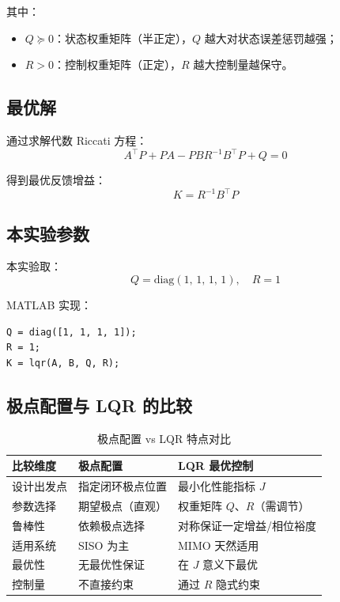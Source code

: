 \documentclass[12pt, a4paper]{article}
\begin{document}
其中：
\begin{itemize}
    \item $Q \succeq 0$：状态权重矩阵（半正定），$Q$ 越大对状态误差惩罚越强；
    \item $R > 0$：控制权重矩阵（正定），$R$ 越大控制量越保守。
\end{itemize}

\subsection{最优解}

通过求解代数 Riccati 方程：
\begin{equation}
    A^\top P + PA - PBR^{-1}B^\top P + Q = 0
\end{equation}

得到最优反馈增益：
\begin{equation}
    \boxed{K = R^{-1}B^\top P}
\end{equation}

\subsection{本实验参数}

本实验取：
\begin{equation}
    Q = \text{diag}(1,\,1,\,1,\,1), \quad R = 1
\end{equation}

MATLAB 实现：
\begin{lstlisting}[style=matlab, caption={LQR设计核心代码}]
Q = diag([1, 1, 1, 1]);
R = 1;
K = lqr(A, B, Q, R);
\end{lstlisting}

\subsection{极点配置与 LQR 的比较}

\begin{table}[H]
\centering
\caption{极点配置 vs LQR 特点对比}
\begin{tabular}{lll}
\toprule
比较维度 & 极点配置 & LQR 最优控制 \\
\midrule
设计出发点  & 指定闭环极点位置 & 最小化性能指标 $J$ \\
参数选择    & 期望极点（直观）  & 权重矩阵 $Q$、$R$（需调节） \\
鲁棒性      & 依赖极点选择      & 对称保证一定增益/相位裕度 \\
适用系统    & SISO 为主         & MIMO 天然适用 \\
最优性      & 无最优性保证      & 在 $J$ 意义下最优 \\
控制量      & 不直接约束        & 通过 $R$ 隐式约束 \\
\bottomrule
\end{tabular}
\end{table}
\end{document}
